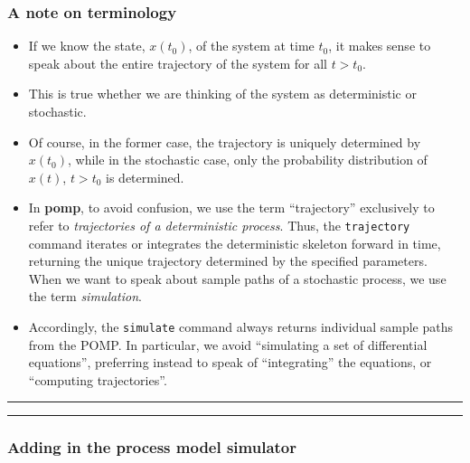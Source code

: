 \documentclass[]{article}
\begin{document}
\subsubsection{A note on terminology}\label{a-note-on-terminology}

\begin{itemize}
\item
  If we know the state, \(x(t_0)\), of the system at time \(t_0\), it
  makes sense to speak about the entire trajectory of the system for all
  \(t>t_0\).
\item
  This is true whether we are thinking of the system as deterministic or
  stochastic.
\item
  Of course, in the former case, the trajectory is uniquely determined
  by \(x(t_0)\), while in the stochastic case, only the probability
  distribution of \(x(t)\), \(t>t_0\) is determined.
\item
  In \textbf{pomp}, to avoid confusion, we use the term ``trajectory''
  exclusively to refer to \emph{trajectories of a deterministic
  process}. Thus, the \texttt{trajectory} command iterates or integrates
  the deterministic skeleton forward in time, returning the unique
  trajectory determined by the specified parameters. When we want to
  speak about sample paths of a stochastic process, we use the term
  \emph{simulation}.


\item
  Accordingly, the \texttt{simulate} command always returns individual
  sample paths from the POMP. In particular, we avoid ``simulating a set
  of differential equations'', preferring instead to speak of
  ``integrating'' the equations, or ``computing trajectories''.
\end{itemize}

\begin{center}\rule{0.5\linewidth}{\linethickness}\end{center}

\begin{center}\rule{0.5\linewidth}{\linethickness}\end{center}

\subsubsection{Adding in the process model
simulator}\label{adding-in-the-process-model-simulator}
\end{document}
